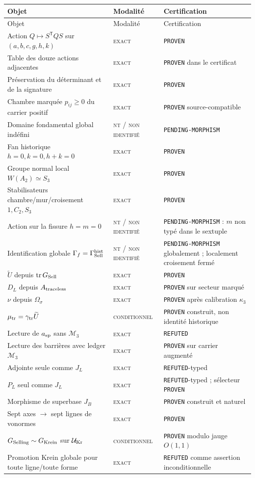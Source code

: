 \documentclass[11pt,a4paper]{article}
\newcommand{\statusExact}{\textsc{exact}}
\newcommand{\statusCond}{\textsc{conditionnel}}
\newcommand{\statusNT}{\textsc{nt / non identifié}}
\newcommand{\certProven}{\texttt{PROVEN}}
\newcommand{\certRefuted}{\texttt{REFUTED}}
\newcommand{\certPending}{\texttt{PENDING-MORPHISM}}
\begin{document}
\begin{longtable}{p{}p{}p{}}
\toprule
Objet & Modalité & Certification \\
\midrule
\endfirsthead
\toprule
Objet & Modalité & Certification \\
\midrule
\endhead
Action $Q\mapsto S^{\mathsf T}QS$ sur $(a,b,c,g,h,k)$ & \statusExact & \certProven \\
Table des douze actions adjacentes & \statusExact & \certProven{} dans le certificat \\
Préservation du déterminant et de la signature & \statusExact & \certProven \\
Chambre marquée $p_{ij}\ge0$ du carrier positif & \statusExact & \certProven{} source-compatible \\
Domaine fondamental global indéfini & \statusNT & \certPending \\
Fan historique $h=0,k=0,h+k=0$ & \statusExact & \certProven \\
Groupe normal local $W(A_2)\simeq S_3$ & \statusExact & \certProven \\
Stabilisateurs chambre/mur/croisement $1,C_2,S_3$ & \statusExact & \certProven \\
Action sur la fissure $h=m=0$ & \statusNT & \certPending{} : $m$ non typé dans le sextuple \\
Identification globale $\Gamma_f=\Gamma_{\rm Sell}^{\rm hist}$ & \statusNT & \certPending{} globalement ; localement croisement fermé \\
$\widetilde U$ depuis $\operatorname{tr}G_{\rm Sell}$ & \statusExact & \certProven \\
$D_L$ depuis $A_{\rm traceless}$ & \statusExact & \certProven{} sur secteur marqué \\
$\nu$ depuis $\Omega_\sigma$ & \statusExact & \certProven{} après calibration $\kappa_3$ \\
$\mu_{\rm tr}=\gamma_{\rm tr}\widetilde U$ & \statusCond & \certProven{} construit, non identité historique \\
Lecture de $a_{\rm sp}$ sans $\mathcal M_3$ & \statusExact & \certRefuted \\
Lecture des barrières avec ledger $\mathcal M_3$ & \statusExact & \certProven{} sur carrier augmenté \\
Adjointe seule comme $J_L$ & \statusExact & \certRefuted{}-typed \\
$P_L$ seul comme $J_L$ & \statusExact & \certRefuted{}-typed ; sélecteur \certProven \\
Morphisme de superbase $J_B$ & \statusExact & \certProven{} construit et naturel \\
Sept axes $\to$ sept lignes de vonormes & \statusExact & \certProven \\
$G_{\rm Selling}\sim G_{\rm Krein}$ sur $\mathcal U_{\rm Kr}$ & \statusCond & \certProven{} modulo jauge $O(1,1)$ \\
Promotion Krein globale pour toute ligne/toute forme & \statusExact & \certRefuted{} comme assertion inconditionnelle \\
\bottomrule
\end{longtable}
\end{document}
